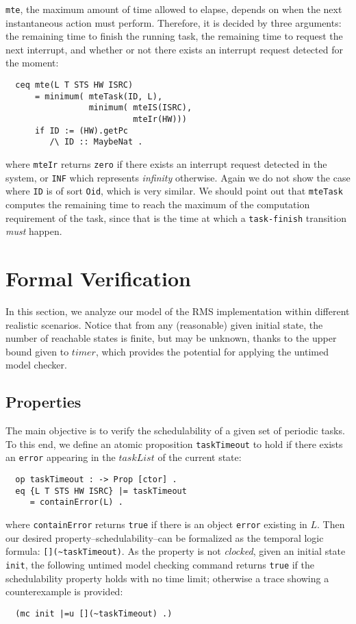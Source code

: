 \documentclass[10pt,journal,compsoc]{IEEEtran}
\begin{document}
\verb|mte|, the maximum amount of time allowed to elapse, depends on
when the next instantaneous action must perform. Therefore, it is
decided by three arguments: the remaining time to finish the running
task, the remaining time to request the next interrupt, and whether or
not there exists an interrupt request detected for the moment:
\begin{verbatim}
  ceq mte(L T STS HW ISRC)
      = minimum( mteTask(ID, L),
                 minimum( mteIS(ISRC), 
                          mteIr(HW)))
      if ID := (HW).getPc 
         /\ ID :: MaybeNat .
\end{verbatim}
where \verb|mteIr| returns \verb|zero| if there exists an interrupt
request detected in the system, or \verb|INF| which represents
\emph{infinity} otherwise. Again we do not show the case where
\verb|ID| is of sort \verb|Oid|, which is very similar. We should
point out that \verb|mteTask| computes the remaining time to reach the
maximum of the computation requirement of the task, since that is the
time at which a \verb|task-finish| transition \emph{must} happen.


\section{Formal Verification}
\label{s:verification}
In this section, we analyze our model of the RMS implementation within
different realistic scenarios.  Notice that from any (reasonable)
given initial state, the number of reachable states is finite, but may
be unknown, thanks to the upper bound given to $timer$, which provides
the potential for applying the untimed model checker.

\subsection{Properties}
The main objective is to verify the schedulability of a given set of
periodic tasks. To this end, we define an atomic proposition
\verb|taskTimeout| to hold if there exists an \verb|error| appearing
in the $taskList$ of the current state:
\begin{verbatim}
  op taskTimeout : -> Prop [ctor] .
  eq {L T STS HW ISRC} |= taskTimeout 
     = containError(L) .
\end{verbatim}
where \verb|containError| returns \verb|true| if there is an object
\verb|error| existing in $L$. Then our desired
property--schedulability--can be formalized as the temporal logic
formula: \verb|[](~taskTimeout)|. As the property is not
\emph{clocked}, given an initial state \verb|init|, the following
untimed model checking command returns \verb|true| if the
schedulability property holds with no time limit; otherwise a trace
showing a counterexample is provided:
\begin{verbatim}
  (mc init |=u [](~taskTimeout) .)
\end{verbatim}
\end{document}
